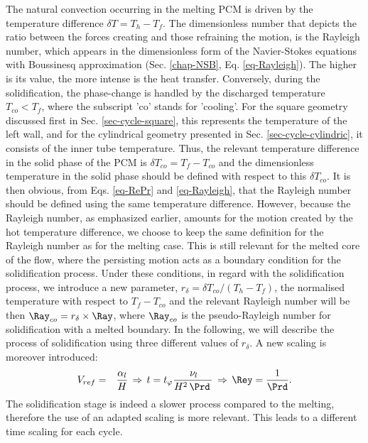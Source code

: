The natural convection occurring in the melting PCM is driven by the temperature difference $\delta T = T_h - T_f$. 
The dimensionless number that depicts the ratio between the forces creating and those refraining the motion, is the Rayleigh number, which appears in the dimensionless form of the Navier-Stokes equations with Boussinesq approximation (Sec. \ref{chap-NSB}, Eq. \eqref{eq-Rayleigh}). 
The higher is its value, the more intense is the heat transfer.
Conversely, during the solidification, the phase-change is handled by the discharged temperature $T_{co} < T_f$, where the subscript 'co' stands for 'cooling'. 
For the square geometry discussed first in Sec. \ref{sec-cycle-square}, this represents the temperature of the left wall, 
and for the cylindrical geometry presented in Sec. \ref{sec-cycle-cylindric}, it consists of the inner tube temperature.
Thus, the relevant temperature difference in the solid phase of the PCM is $\delta T_{co} = T_f-T_{co}$ and the dimensionless temperature in the solid phase should be defined with respect to this $\delta T_{co}$. 
It is then obvious, from Eqs. \eqref{eq-RePr} and \eqref{eq-Rayleigh},  that the Rayleigh number should be defined using the same temperature difference.  
However, because the Rayleigh number, as emphasized earlier, amounts for the motion created by the hot temperature difference, we choose to keep the same definition for the Rayleigh number as for the melting case. 
This is still relevant for the melted core of the flow, where the persisting motion acts as a boundary condition for the solidification process.    
Under these conditions, in regard with the solidification process, we introduce  a new parameter,  $r_{\delta} = \delta T_{co}/(T_h-T_f)$, the normalised temperature with respect to 
$T_f-T_{co}$ and the relevant Rayleigh number will be then  $\Ray_{co}= r_{\delta} \times \Ray$, where $\Ray_{co}$ is the pseudo-Rayleigh number for solidification with a melted boundary. 
In the following, we will  describe  the process of solidification using three different values of $r_{\delta}$. 
A new scaling is moreover introduced: 
\begin{eqnarray}\label{ref-adimPCM2}
V_{ref}&=&\frac{\alpha_l}{H}  \, \Rightarrow  \, t = t_{\varphi} \frac{\, \nu_l }{ H^2 \, \Prd \,}\, \Rightarrow  \, \Rey  = \frac{1}{\Prd}.  \label{ref-adimdT} 
\end{eqnarray}
The solidification stage is indeed a slower process compared to the melting, therefore the use of an adapted scaling is more relevant.
This leads to a different time scaling for each cycle.

